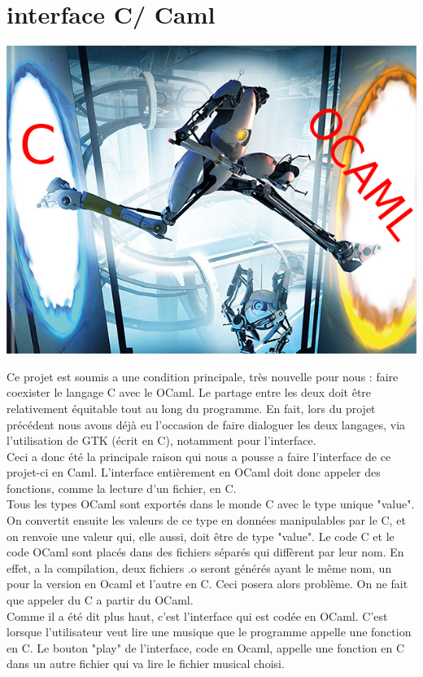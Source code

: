 \documentclass[12pt]{report}
\begin{document}
\chapter{interface C/ Caml}

\includegraphics[scale=0.5]{COcaml.jpg}

Ce projet est soumis a une condition principale, très nouvelle pour nous : faire coexister le langage C avec le OCaml. Le partage entre les deux doit être relativement équitable tout au long du programme. En fait, lors du projet précédent nous avons déjà eu l'occasion de faire dialoguer les deux langages, via l'utilisation de GTK (écrit en C), notamment pour l'interface.\\

Ceci a donc été la principale raison qui nous a pousse a faire l'interface de ce projet-ci en Caml. L'interface entièrement en OCaml doit donc appeler des fonctions, comme la lecture d'un fichier, en C.\\

Tous les types OCaml sont exportés dans le monde C avec le type unique "value". On convertit ensuite les valeurs de ce type en données manipulables par le C, et on renvoie une valeur qui, elle aussi, doit être de type "value". Le code C et le code OCaml sont placés dans des fichiers séparés qui diffèrent par leur nom. En effet, a la compilation, deux fichiers .o seront générés ayant le même nom, un pour la version en Ocaml et l'autre en C. Ceci posera alors problème. On ne fait que appeler du C a partir du OCaml.\\

Comme il a été dit plus haut, c'est l'interface qui est codée en OCaml. C'est lorsque l'utilisateur veut lire une musique que le programme appelle une fonction en C. Le bouton "play" de l'interface, code en Ocaml, appelle une fonction en C dans un autre fichier qui va lire le fichier musical choisi.\\
\end{document}
